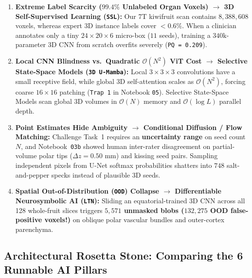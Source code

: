 \documentclass[10.5pt,a4paper]{article}
\begin{document}
\begin{enumerate}
    \item \textbf{Extreme Label Scarcity ($99.4\%$ Unlabeled Organ Voxels) $\rightarrow$ 3D Self-Supervised Learning (\texttt{SSL}):} Our 7T kiwifruit scan contains $8{,}388{,}608$ voxels, whereas expert 3D instance labels cover $<0.6\%$. When a clinician annotates only a tiny $24 \times 20 \times 6$ micro-box ($11$ seeds), training a $340\text{k}$-parameter 3D CNN from scratch overfits severely (\texttt{PQ = 0.209}).
    \item \textbf{Local CNN Blindness vs.\ Quadratic $\mathcal{O}(N^2)$ ViT Cost $\rightarrow$ Selective State-Space Models (\texttt{3D U-Mamba}):} Local $3\times 3\times 3$ convolutions have a small receptive field, while global 3D self-attention scales as $\mathcal{O}(N^2)$, forcing coarse $16\times 16$ patching (\texttt{Trap 1} in Notebook \texttt{05}). Selective State-Space Models scan global 3D volumes in $\mathcal{O}(N)$ memory and $\mathcal{O}(\log L)$ parallel depth.
    \item \textbf{Point Estimates Hide Ambiguity $\rightarrow$ Conditional Diffusion / Flow Matching:} Challenge Task~1 requires an \textbf{uncertainty range} on seed count $N$, and Notebook~\texttt{03b} showed human inter-rater disagreement on partial-volume polar tips ($\Delta z = 0.50\text{ mm}$) and kissing seed pairs. Sampling independent pixels from U-Net softmax probabilities shatters into $748$ salt-and-pepper specks instead of plausible 3D seeds.
    \item \textbf{Spatial Out-of-Distribution (\texttt{OOD}) Collapse $\rightarrow$ Differentiable Neurosymbolic AI (\texttt{LTN}):} Sliding an equatorial-trained 3D CNN across all 128 whole-fruit slices triggers \textbf{$5{,}571$ unmasked blobs ($132{,}275$ OOD false-positive voxels!)} on oblique polar vascular bundles and outer-cortex parenchyma.
\end{enumerate}

\newpage
\subsection{Architectural Rosetta Stone: Comparing the 6 Runnable AI Pillars}
\end{document}
